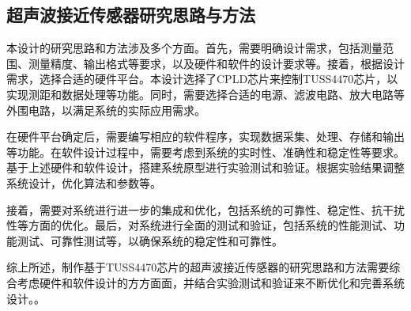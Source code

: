     \subsection{超声波接近传感器研究思路与方法}
    本设计的研究思路和方法涉及多个方面。首先，需要明确设计需求，包括测量范围、测量精度、输出格式等要求，以及硬件和软件的设计要求等。接着，根据设计需求，选择合适的硬件平台。本设计选择了CPLD芯片来控制TUSS4470芯片，以实现测距和数据处理等功能。同时，需要选择合适的电源、滤波电路、放大电路等外围电路，以满足系统的实际应用需求。
    
    在硬件平台确定后，需要编写相应的软件程序，实现数据采集、处理、存储和输出等功能。在软件设计过程中，需要考虑到系统的实时性、准确性和稳定性等要求。基于上述硬件和软件设计，搭建系统原型进行实验测试和验证。根据实验结果调整系统设计，优化算法和参数等。
    
    接着，需要对系统进行进一步的集成和优化，包括系统的可靠性、稳定性、抗干扰性等方面的优化。最后，对系统进行全面的测试和验证，包括系统的性能测试、功能测试、可靠性测试等，以确保系统的稳定性和可靠性。
    
    综上所述，制作基于TUSS4470芯片的超声波接近传感器的研究思路和方法需要综合考虑硬件和软件设计的方方面面，并结合实验测试和验证来不断优化和完善系统设计。。